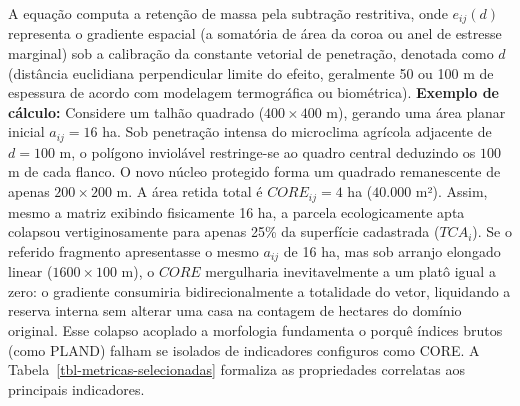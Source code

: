 \documentclass[
  portuguese,
  11pt,
  a4paper,
  open=any]{scrbook}
\begin{document}
A equação computa a retenção de massa pela subtração restritiva, onde
\(e_{ij}(d)\) representa o gradiente espacial (a somatória de área da
coroa ou anel de estresse marginal) sob a calibração da constante
vetorial de penetração, denotada como \(d\) (distância euclidiana
perpendicular limite do efeito, geralmente 50 ou 100 m de espessura de
acordo com modelagem termográfica ou biométrica). \textbf{Exemplo de
cálculo:} Considere um talhão quadrado (\(400 \times 400\) m), gerando
uma área planar inicial \(a_{ij} = 16\) ha. Sob penetração intensa do
microclima agrícola adjacente de \(d = 100\) m, o polígono inviolável
restringe-se ao quadro central deduzindo os \(100\) m de cada flanco. O
novo núcleo protegido forma um quadrado remanescente de apenas
\(200 \times 200\) m. A área retida total é \(CORE_{ij} = 4\) ha
(\(40.000\) m²). Assim, mesmo a matriz exibindo fisicamente 16 ha, a
parcela ecologicamente apta colapsou vertiginosamente para apenas 25\%
da superfície cadastrada (\(TCA_i\)). Se o referido fragmento
apresentasse o mesmo \(a_{ij}\) de 16 ha, mas sob arranjo elongado
linear (\(1600 \times 100\) m), o \(CORE\) mergulharia inevitavelmente a
um platô igual a zero: o gradiente consumiria bidirecionalmente a
totalidade do vetor, liquidando a reserva interna sem alterar uma casa
na contagem de hectares do domínio original. Esse colapso acoplado a
morfologia fundamenta o porquê índices brutos (como PLAND) falham se
isolados de indicadores configuros como CORE. A
Tabela~\ref{tbl-metricas-selecionadas} formaliza as propriedades
correlatas aos principais indicadores.
\end{document}
